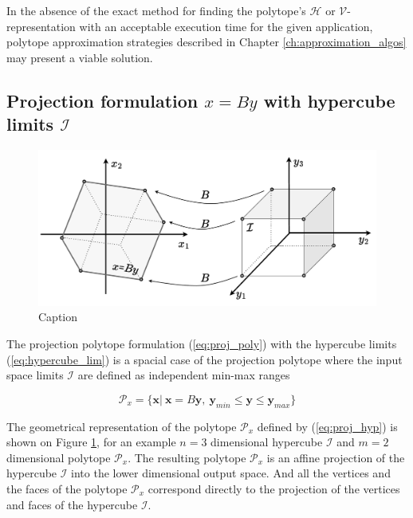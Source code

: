 In the absence of the exact method for finding the polytope's $\mathcal{H}$ or $\mathcal{V}$-representation with an acceptable execution time for the given application, polytope approximation strategies described in Chapter \ref{ch:approximation_algos} may present a viable solution. 

\subsection{Projection formulation $x=By$ with hypercube limits $\mathcal{I}$}
\begin{figure}[!htb]
    \centering
    \includegraphics[width=0.8\linewidth]{Chapters/imgs/projection.pdf}
    \caption{Caption}
    \label{fig:proj}
\end{figure}

The projection polytope formulation (\ref{eq:proj_poly}) with the hypercube limits (\ref{eq:hypercube_lim}) is a spacial case of the projection polytope where the input space limits $\mathcal{I}$ are defined as independent min-max ranges 

\begin{equation}
    \mathcal{P}_x=\{\bm{x} |~ \bm{x} = B\bm{y},~\bm{y}_{min} \leq  \bm{y} \leq \bm{y}_{max}  \}
    \label{eq:proj_hyp}
\end{equation}

The geometrical representation of the polytope $\mathcal{P}_x$ defined by (\ref{eq:proj_hyp}) is shown on Figure \ref{fig:proj}, for an example $n=3$ dimensional hypercube $\mathcal{I}$ and $m=2$ dimensional polytope $\mathcal{P}_x$. The resulting polytope $\mathcal{P}_x$ is an affine projection of the hypercube $\mathcal{I}$ into the lower dimensional output space. And all the vertices and the faces of the polytope $\mathcal{P}_x$ correspond directly to the projection of the vertices and faces of the hypercube $\mathcal{I}$. 
 
